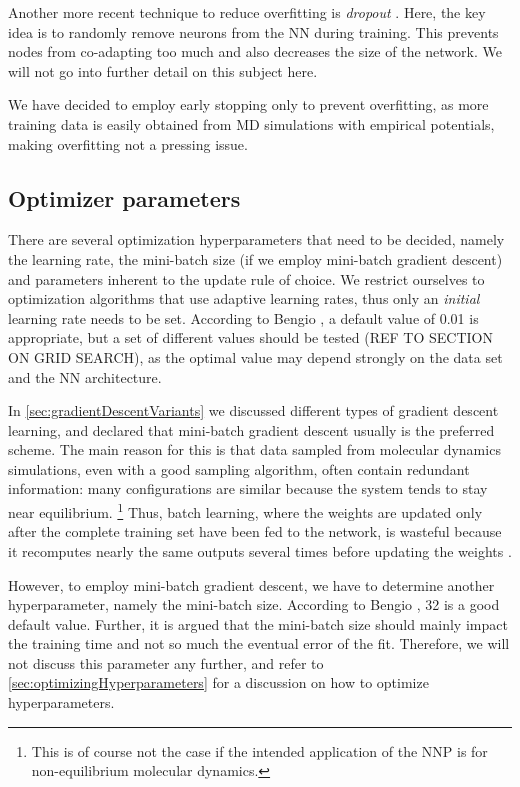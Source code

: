 \documentclass[twoside,english]{uiofysmaster}
\begin{document}
Another more recent technique to reduce overfitting is \textit{dropout} \cite{Srivastava14}. Here, the key idea 
is to randomly remove neurons from the NN during training. This prevents nodes from co-adapting too much and 
also decreases the size of the network. We will not go into further detail on this subject here. 

We have decided to employ early stopping only to prevent overfitting, as more training data is easily obtained from MD 
simulations with empirical potentials, making overfitting not a pressing issue. 


\subsection{Optimizer parameters}
There are several optimization hyperparameters that need to be decided, namely the learning rate, the mini-batch size
(if we employ mini-batch gradient descent) and parameters inherent to the update rule of choice. 
We restrict ourselves to optimization algorithms that use adaptive learning rates, thus only an \textit{initial}
learning rate needs to be set. According to Bengio \cite{Bengio12}, a default value of 0.01 is appropriate, but 
a set of different values should be tested (REF TO SECTION ON GRID SEARCH), 
as the optimal value may depend strongly on the data set and the NN architecture. 

In \autoref{sec:gradientDescentVariants} we discussed different types of gradient descent learning, and 
declared that mini-batch gradient descent usually is the preferred scheme. The main reason for this is that data sampled from molecular 
dynamics simulations, even with a good sampling algorithm, often contain redundant information: many configurations 
are similar because the system tends to stay near equilibrium. \footnote{This is of course not the case if the intended
application of the NNP is for non-equilibrium molecular dynamics.} Thus, batch learning, where the weights are updated 
only after the complete training set have been fed to the network, is wasteful because it recomputes nearly the same outputs
several times before updating the weights \cite{LeCun99}. 

However, to employ mini-batch gradient descent, we have to determine another 
hyperparameter, namely the mini-batch size. According to Bengio \cite{Bengio12}, 32 is a good default value. Further, it is argued 
that the mini-batch size should mainly impact the training time and not so much the eventual error of the fit.
Therefore, we will not discuss this parameter any further, and refer to \autoref{sec:optimizingHyperparameters} for a discussion
on how to optimize hyperparameters.
\end{document}

